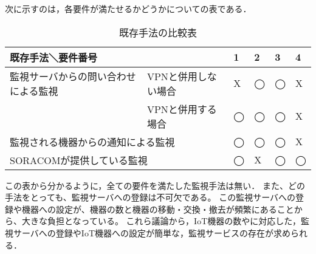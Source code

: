 	次に示すのは，各要件が満たせるかどうかについての表である．\\
	\begin{table}[htbp]
	\caption{既存手法の比較表}
	\begin{tabular}{|l|l|l|l|l|l|} \hline
		\multicolumn{2}{|l|}{既存手法＼要件番号} & 1 & 2 & 3 & 4\\ \hline \hline
		監視サーバからの問い合わせによる監視 & VPNと併用しない場合 & X & ◯ & ◯ & X  \\ \cline{2-6}
			& VPNと併用する場合 & ◯ & ◯ & ◯ & X \\ \hline
		\multicolumn{2}{|l|}{監視される機器からの通知による監視} & ◯ & ◯ & ◯ & X \\ \hline
		\multicolumn{2}{|l|}{SORACOMが提供している監視} & ◯ & X & ◯ & ◯ \\ \hline
	\end{tabular}
	\end{table}
	この表から分かるように，全ての要件を満たした監視手法は無い．
	また、どの手法をとっても、監視サーバへの登録は不可欠である。
	この監視サーバへの登録や機器への設定が、機器の数と機器の移動・交換・撤去が頻繁にあることから、大きな負担となっている。
	これら議論から，IoT機器の数やに対応した，監視サーバへの登録やIoT機器への設定が簡単な，監視サービスの存在が求められる．

